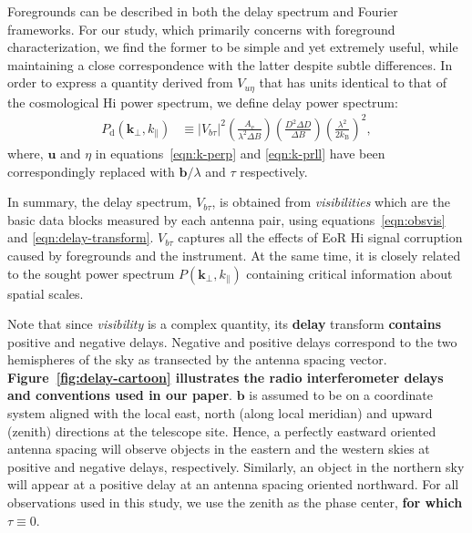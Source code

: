 \documentclass[preprint2,iop,numberedappendix]{emulateapj}
\begin{document}
Foregrounds can be described in both the delay spectrum and Fourier frameworks. For our study, which primarily concerns with foreground characterization, we find the former to be simple and yet extremely useful, while maintaining a close correspondence with the latter despite subtle differences. In order to express a quantity derived from $V_{u\eta}$ that has units identical to that of the cosmological H{\sc i} power spectrum, we define delay power spectrum:
\begin{align}\label{eqn:fake-power-spectrum}
  P_\textrm{d}(\boldsymbol{k}_\perp,k_\parallel) &\equiv |V_{b\tau}|^2\left(\frac{A_\textrm{e}}{\lambda^2\Delta B}\right)\left(\frac{D^2\Delta D}{\Delta B}\right)\left(\frac{\lambda^2}{2k_\textrm{B}}\right)^2,
\end{align}
where, $\boldsymbol{u}$ and $\eta$ in equations~\ref{eqn:k-perp} and \ref{eqn:k-prll} have been correspondingly replaced with $\boldsymbol{b}/\lambda$ and $\tau$ respectively. 

In summary, the delay spectrum, $V_{b\tau}$, is obtained from {\it visibilities} which are the basic data blocks measured by each antenna pair, using equations~\ref{eqn:obsvis} and \ref{eqn:delay-transform}. $V_{b\tau}$ captures all the effects of EoR H{\sc i} signal corruption caused by foregrounds and the instrument. At the same time, it is closely related to the sought power spectrum $P(\boldsymbol{k}_\perp,k_\parallel)$ containing critical information about spatial scales. %

Note that since {\it visibility} is a complex quantity, its {\bf delay} transform {\bf contains} positive and negative delays. Negative and positive delays correspond to the two hemispheres of the sky as transected by the antenna spacing vector. {\bf Figure~\ref{fig:delay-cartoon} illustrates the radio interferometer delays and conventions used in our paper}. $\boldsymbol{b}$ is assumed to be on a coordinate system aligned with the local east, north (along local meridian) and upward (zenith) directions at the telescope site. Hence, a perfectly eastward oriented antenna spacing will observe objects in the eastern and the western skies at positive and negative delays, respectively. Similarly, an object in the northern sky will appear at a positive delay at an antenna spacing oriented northward. For all observations used in this study, we use the zenith as the phase center, {\bf for which $\tau\equiv 0$}. 
\end{document}
